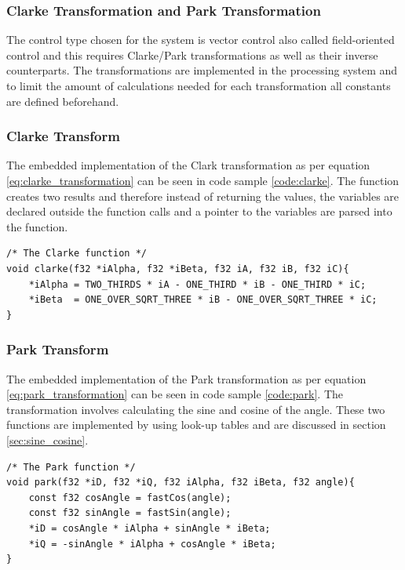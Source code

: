 \subsubsection{Clarke Transformation and Park Transformation}
The control type chosen for the system is vector control also called field-oriented control and this requires Clarke/Park transformations as well as their inverse counterparts.
The transformations are implemented in the processing system and to limit the amount of calculations needed for each transformation all constants are defined beforehand.

\subsubsection*{Clarke Transform}


The embedded implementation of the Clark transformation as per equation \ref{eq:clarke_transformation} can be seen in code sample \ref{code:clarke}. The function creates two results and therefore instead of returning the values, the variables are declared outside the function calls and a pointer to the variables are parsed into the function.

\begin{lstlisting}[style=c, caption=Embedded Clarke Transformation., label=code:clarke]
/* The Clarke function */
void clarke(f32 *iAlpha, f32 *iBeta, f32 iA, f32 iB, f32 iC){
	*iAlpha = TWO_THIRDS * iA - ONE_THIRD * iB - ONE_THIRD * iC;
	*iBeta  = ONE_OVER_SQRT_THREE * iB - ONE_OVER_SQRT_THREE * iC;
}
\end{lstlisting}

\subsubsection*{Park Transform}
The embedded implementation of the Park transformation as per equation \ref{eq:park_transformation} can be seen in code sample \ref{code:park}. The transformation involves calculating the sine and cosine of the angle. These two functions are implemented by using look-up tables and are discussed in section \ref{sec:sine_cosine}.

\begin{lstlisting}[style=c, caption=Embedded Park Transformation., label=code:park]
/* The Park function */
void park(f32 *iD, f32 *iQ, f32 iAlpha, f32 iBeta, f32 angle){
	const f32 cosAngle = fastCos(angle);
	const f32 sinAngle = fastSin(angle);
	*iD = cosAngle * iAlpha + sinAngle * iBeta;
	*iQ = -sinAngle * iAlpha + cosAngle * iBeta;
}
\end{lstlisting}

